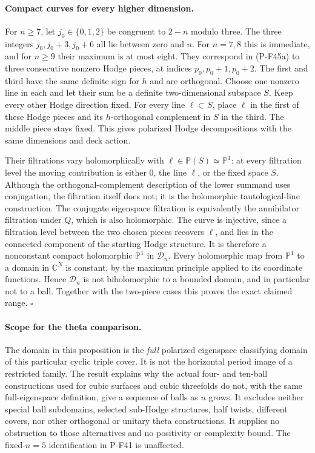 \paragraph{Compact curves for every higher dimension.}
For $n\ge7$, let $j_0\in\{0,1,2\}$ be congruent to
$2-n$ modulo three. The three integers
$j_0,j_0+3,j_0+6$ all lie between zero and $n$.
For $n=7,8$ this is immediate, and for $n\ge9$ their
maximum is at most eight. They correspond in (P-F45a)
to three consecutive nonzero Hodge pieces, at indices
$p_0,p_0+1,p_0+2$. The first and third have the same
definite sign for $h$ and are orthogonal. Choose one
nonzero line in each and let their sum be a definite
two-dimensional subspace $S$. Keep every other Hodge
direction fixed. For every line $\ell\subset S$, place
$\ell$ in the first of these Hodge pieces and its
$h$-orthogonal complement in $S$ in the third. The
middle piece stays fixed. This gives polarized Hodge
decompositions with the same dimensions and deck action.

Their filtrations vary holomorphically with
$\ell\in\mathbb P(S)\simeq\mathbb P^1$: at every
filtration level the moving contribution is either
$0$, the line $\ell$, or the fixed space $S$. Although
the orthogonal-complement description of the lower
summand uses conjugation, the filtration itself does
not; it is the holomorphic tautological-line construction.
The conjugate eigenspace filtration is equivalently
the annihilator filtration under $Q$, which is also
holomorphic. The curve is injective, since a filtration
level between the two chosen pieces recovers $\ell$,
and lies in the connected component of the starting
Hodge structure. It is therefore a nonconstant compact
holomorphic $\mathbb P^1$ in $\mathcal D_n$.
Every holomorphic map from $\mathbb P^1$ to a domain
in $\mathbb C^N$ is constant, by the maximum principle
applied to its coordinate functions. Hence
$\mathcal D_n$ is not biholomorphic to a bounded domain,
and in particular not to a ball. Together with the
two-piece cases this proves the exact claimed range.
\hfill$\square$

\paragraph{Scope for the theta comparison.}
The domain in this proposition is the \emph{full}
polarized eigenspace classifying domain of this particular
cyclic triple cover. It is not the horizontal period image
of a restricted family. The result explains why the actual
four- and ten-ball constructions used for cubic surfaces
and cubic threefolds do not, with the same full-eigenspace
definition, give a sequence of balls as $n$ grows.
It excludes neither special ball subdomains, selected
sub-Hodge structures, half twists, different covers, nor
other orthogonal or unitary theta constructions. It supplies
no obstruction to those alternatives and no positivity or
complexity bound. The fixed-$n=5$ identification in P-F41
is unaffected.

